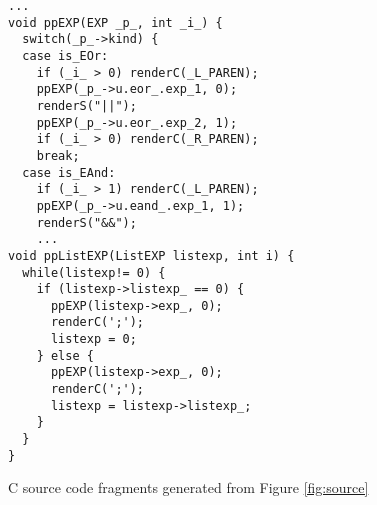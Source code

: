 \begin{figure}
\begin{boxedminipage}[t]{\textwidth}
\begin{minipage}[r]{0.5\textwidth}
\scriptsize
\begin{verbatim}
...
void ppEXP(EXP _p_, int _i_) {
  switch(_p_->kind) {
  case is_EOr:
    if (_i_ > 0) renderC(_L_PAREN);
    ppEXP(_p_->u.eor_.exp_1, 0);
    renderS("||");
    ppEXP(_p_->u.eor_.exp_2, 1);
    if (_i_ > 0) renderC(_R_PAREN);
    break;
  case is_EAnd:
    if (_i_ > 1) renderC(_L_PAREN);
    ppEXP(_p_->u.eand_.exp_1, 1);
    renderS("&&");
    ...
void ppListEXP(ListEXP listexp, int i) {
  while(listexp!= 0) {
    if (listexp->listexp_ == 0) {
      ppEXP(listexp->exp_, 0);
      renderC(';');
      listexp = 0;
    } else {
      ppEXP(listexp->exp_, 0);
      renderC(';');
      listexp = listexp->listexp_;
    }
  }
}
\end{verbatim}
\normalsize
\hfill
\end{minipage}
\end{boxedminipage}
\caption{C source code fragments generated from Figure \ref{fig:source}}
\label{fig:c}
\end{figure}

